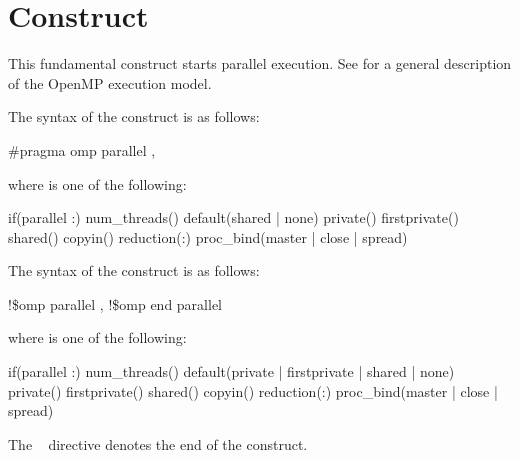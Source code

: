\section{ Construct}
\label{sec:parallel Construct}
\summary
This fundamental construct starts parallel execution. See 
for a general description of the OpenMP execution model.

\syntax
\ccppspecificstart
The syntax of the  construct is as follows:
\begin{boxedcode}
\#pragma omp parallel \plc{[clause[ [},\plc{] clause] ... ] new-line}
\end{boxedcode}

where  is one of the following:

\begin{indentedcodelist}
if(\plc{[}parallel :\plc{] scalar-expression})
num\_threads()
default(shared \textnormal{|} none)
private()
firstprivate()
shared()
copyin()
reduction(:)
proc\_bind(master \textnormal{|} close \textnormal{|} spread)
\end{indentedcodelist}
\ccppspecificend

\fortranspecificstart
The syntax of the  construct is as follows:

\begin{boxedcode}
!\$omp parallel \plc{[clause[ [},\plc{] clause] ... ]}
!\$omp end parallel
\end{boxedcode}

\begin{samepage}
where  is one of the following:

\begin{indentedcodelist}
if(\plc{[}parallel :\plc{] scalar-logical-expression})
num\_threads()
default(private \textnormal{|} firstprivate \textnormal{|} shared \textnormal{|} none)
private()
firstprivate()
shared()
copyin()
reduction(:)
proc\_bind(master \textnormal{|} close \textnormal{|} spread)
\end{indentedcodelist}
\end{samepage}

The ~ directive denotes the end of the  construct.
\fortranspecificend


